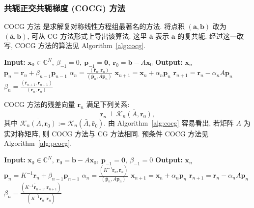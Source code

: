 \subsubsection{{共轭正交共轭梯度 (COCG) 方法}}\label{subsec:cocg-method}
{COCG 方法  是求解复对称线性方程组最著名的方法. 将点积 $(\bm a,\bm b)$ 改为 $(\bar{\bm a},\bm b)$, 可从 CG 方法形式上导出该算法. 这里 $\bar{\bm a}$ 表示 $\bm a$ 的复共轭. 经过这一改写, COCG 方法的算法见 Algorithm\ \ref{alg:cocg}.}
\begin{algorithm}[H]\caption{{COCG 方法 (注意: $(\bar{\bm a},\bm b)=\bm a^{\top}\bm b$)}}\label{alg:cocg}\begin{algorithmic}[1]
\Statex\textbf{Input:} $\bm x_0\in\mathbb C^N,\ \beta_{-1}=0,\ \bm p_{-1}=\bm0,\ \bm r_0=\bm b-A\bm x_0$
\Statex\textbf{Output:} $\bm x_n$
\State $\bm p_n=\bm r_n+\beta_{n-1}\bm p_{n-1}$
\State $\alpha_n=\frac{(\bar{\bm r}_n,\bm r_n)}{(\bar{\bm p}_n,A\bm p_n)}$
\State $\bm x_{n+1}=\bm x_n+\alpha_n\bm p_n$
\State $\bm r_{n+1}=\bm r_n-\alpha_nA\bm p_n$
\State $\beta_n=\frac{(\bar{\bm r}_{n+1},\bm r_{n+1})}{(\bar{\bm r}_n,\bm r_n)}$
\EndFor\end{algorithmic}\end{algorithm}
{COCG 方法的残差向量 $\bm r_n$ 满足下列关系:}
\[\bm r_n\perp\overline{\mathcal K_n(A,\bm r_0)},\]
{其中 $\overline{\mathcal K_n(A,\bm r_0)}:=\mathcal K_n(\bar A,\bar{\bm r}_0)$. 由 Algorithm\ \ref{alg:cocg} 容易看出, 若矩阵 $A$ 为实对称矩阵, 则 COCG 方法与 CG 方法相同. 预条件 COCG 方法见 Algorithm\ \ref{alg:pcocg}.}
\begin{algorithm}[H]\caption{{预条件 COCG 方法 (注意: $(\bar{\bm a},\bm b)=\bm a^{\top}\bm b$)}}\label{alg:pcocg}\begin{algorithmic}[1]
\Statex\textbf{Input:} $\bm x_0\in\mathbb C^N,\ \bm r_0=\bm b-A\bm x_0,\ \bm p_{-1}=\bm0,\ \beta_{-1}=0$
\Statex\textbf{Output:} $\bm x_n$
\State $\bm p_n=K^{-1}\bm r_n+\beta_{n-1}\bm p_{n-1}$
\State $\alpha_n=\frac{(\overline{K^{-1}\bm r_n},\bm r_n)}{(\bar{\bm p}_n,A\bm p_n)}$
\State $\bm x_{n+1}=\bm x_n+\alpha_n\bm p_n$
\State $\bm r_{n+1}=\bm r_n-\alpha_nA\bm p_n$
\State $\beta_n=\frac{(\overline{K^{-1}\bm r_{n+1}},\bm r_{n+1})}{(\overline{K^{-1}\bm r_n},\bm r_n)}$
\EndFor\end{algorithmic}\end{algorithm}
